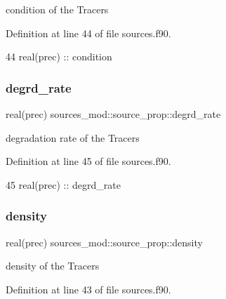condition of the Tracers 



Definition at line 44 of file sources.\+f90.


\begin{DoxyCode}
44         \textcolor{keywordtype}{real(prec)} :: condition
\end{DoxyCode}
\mbox{\label{structsources__mod_1_1source__prop_a6c302a7a21c554720641b4f377489794}} 
\subsubsection{\texorpdfstring{degrd\+\_\+rate}{degrd\_rate}}
{\footnotesize\ttfamily real(prec) sources\+\_\+mod\+::source\+\_\+prop\+::degrd\+\_\+rate\hspace{0.3cm}{\ttfamily [private]}}



degradation rate of the Tracers 



Definition at line 45 of file sources.\+f90.


\begin{DoxyCode}
45         \textcolor{keywordtype}{real(prec)} :: degrd\_rate
\end{DoxyCode}
\mbox{\label{structsources__mod_1_1source__prop_ac569c18f02e33c5ca95f423bcb9fb30e}} 
\subsubsection{\texorpdfstring{density}{density}}
{\footnotesize\ttfamily real(prec) sources\+\_\+mod\+::source\+\_\+prop\+::density\hspace{0.3cm}{\ttfamily [private]}}



density of the Tracers 



Definition at line 43 of file sources.\+f90.


